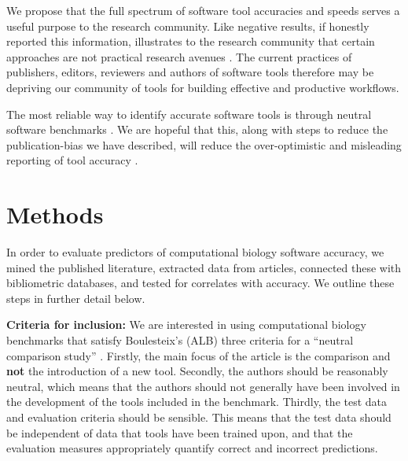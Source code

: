 \documentclass[fleqn,10pt]{SelfArx} %
\begin{document}


We propose that the full spectrum of software tool accuracies and
speeds serves a useful purpose to the research community. Like negative
results, if honestly reported this information, illustrates to the research community
that certain approaches are not practical research avenues
\cite{fanelli2012negative}. %
The current
practices of publishers, editors, reviewers and authors of software
tools therefore may be depriving our community of tools for building effective
and productive workflows.

The most reliable way to identify accurate software tools is through neutral
software benchmarks \cite{Boulesteix2013-vb}. We are hopeful that
this, along with steps to reduce the publication-bias we have
described, will reduce the over-optimistic and misleading reporting of
tool accuracy \cite{Boulesteix2010-te,Jelizarow2010-zf,Norel2011-cq}.


\section*{Methods}
In order to evaluate predictors of computational biology software
accuracy, we mined the published literature, extracted data from
articles, connected these with bibliometric databases, and tested for
correlates with accuracy. We outline these steps in further detail
below.

\textbf{Criteria for inclusion:} We are interested in using
computational biology benchmarks that satisfy Boulesteix’s
(ALB) three criteria for a “neutral comparison study”
\cite{Boulesteix2013-vb}. Firstly, the main focus of the article is
the comparison and \textbf{not} the introduction of a new
tool. Secondly, the authors should be reasonably neutral, which means
that the authors should not generally have been involved in the
development of the tools included in the benchmark. Thirdly, the test
data and evaluation criteria should be sensible. This means that the
test data should be independent of data that tools have been trained
upon, and that the evaluation measures appropriately quantify correct
and incorrect predictions.
\end{document}
